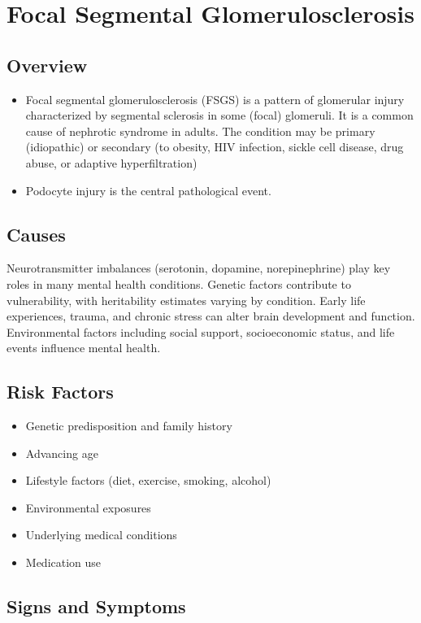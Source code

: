 \chapter{Focal Segmental Glomerulosclerosis}
\label{sec:Focal Segmental Glomerulosclerosis}

\section{Overview}


\begin{itemize}[noitemsep]
  \item Focal segmental glomerulosclerosis (FSGS) is a pattern of glomerular injury characterized by segmental sclerosis in some (focal) glomeruli. It is a common cause of nephrotic syndrome in adults. The condition may be primary (idiopathic) or secondary (to obesity, HIV infection, sickle cell disease, drug abuse, or adaptive hyperfiltration)
  \item Podocyte injury is the central pathological event.
\end{itemize}
\section{Causes}
Neurotransmitter imbalances (serotonin, dopamine, norepinephrine) play key roles in many mental health conditions. Genetic factors contribute to vulnerability, with heritability estimates varying by condition. Early life experiences, trauma, and chronic stress can alter brain development and function. Environmental factors including social support, socioeconomic status, and life events influence mental health.   
\section{Risk Factors}
\begin{itemize}[noitemsep]
  \item Genetic predisposition and family history
  \item Advancing age
  \item Lifestyle factors (diet, exercise, smoking, alcohol)
  \item Environmental exposures
  \item Underlying medical conditions
  \item Medication use
\end{itemize}
\section{Signs and Symptoms}
